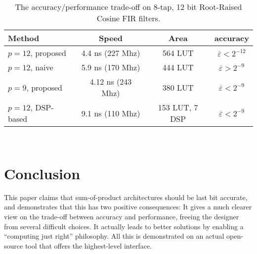 \documentclass[twocolumn]{IEEEtran}
\newcommand{\abserr}{\varepsilon}
\newcommand{\maxerr}{\bound{\abserr}}
\newcommand{\bound}[1]{\overline{#1}}
\begin{document}
\begin{table}
  \begin{center}
      \begin{tabular}{|l||c|c|c|}
        \hline
        Method                       &  Speed  		   	&      \multicolumn{1}{|c|}{Area}  & accuracy	 \\
        \hline
        \hline
         $p=12$, proposed &  4.4 ns (227 Mhz) & 564 LUT &  $\maxerr<2^{-12}$\\
        \hline
        $p=12$, naive &  5.9 ns (170 Mhz) & 444 LUT & $\maxerr>2^{-9}$\\
        \hline
        $p=9$, proposed &  4.12 ns (243 Mhz) & 380 LUT & $\maxerr<2^{-9}$\\
        \hline
        \hline
        $p=12$, DSP-based  &  9.1 ns (110 Mhz) & 153 LUT, 7 DSP  & $\maxerr<2^{-9}$\\
        \hline
      \end{tabular}
  \end{center}
  \caption{The accuracy/performance trade-off on 8-tap, 12 bit  Root-Raised Cosine FIR filters.\label{tab:results:cmp}}
\end{table}










~\\


\section*{Conclusion}

This paper claims that  sum-of-product architectures should be last bit accurate, and demonstrates that this has two positive consequences:
It gives a much clearer view on the trade-off between accuracy and performance, freeing the designer from several difficult choices.
It actually leads to better solutions by enabling a ``computing just right'' philosophy.
All this is demonstrated on an actual open-source tool that offers the highest-level interface.
\end{document}
